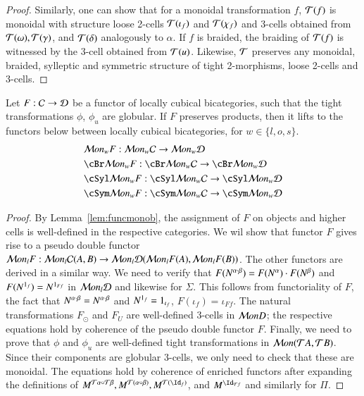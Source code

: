 \begin{proof}

Similarly, one can show that for a monoidal transformation $f$, $\mathcal{T}(f)$ is monoidal with structure loose 2-cells $\mathcal{T}(\iota_f)$ and $\mathcal{T}(\chi_f)$ and 3-cells obtained from $\mathcal{T}(\omega),  \mathcal{T}(\gamma)$, and $\mathcal{T}(\delta)$ analogously to $\alpha$. If $f$ is braided, the braiding of $\mathcal{T}(f)$ is witnessed by the 3-cell obtained from $\mathcal{T}(u)$. Likewise, $\mathcal{T}$ preserves any monoidal, braided, sylleptic and symmetric structure of tight 2-morphisms, loose 2-cells and 3-cells. 
 \end{proof}


\begin{thm}\label{thm:lcbcfunctor}
Let $F: \mathcal{C}  \rightarrow \mathcal{D}$ be a functor of locally cubical bicategories, such that the tight transformations $\phi$, $\phi_u$ are globular. If $F$ preserves products, then it lifts to the functors below between locally cubical bicategories, for $w \in \{l,o,s\}$.
\begin{align*}
&\cM on_wF: \cM on_w \cC  \rightarrow \cM on_w\cD\\ 
&\cBr \cM on_wF: \cBr \cM on_w \cC  \rightarrow \cBr \cM on_w\cD\\
& \cSyl \cM on_wF: \cSyl \cM on_w \cC  \rightarrow \cSyl \cM on_w\cD\\
&\cSym \cM on_wF: \cSym \cM on_w \cC  \rightarrow \cSym \cM on_w\cD
\end{align*}
\end{thm}

\begin{proof}
By Lemma~\ref{lem:funcmonob}, the assignment of $F$ on objects and higher cells is well-defined in the respective categories.
We wil show that functor $F$ gives rise to a pseudo double functor $\mathcal{M} on_lF: \mathcal{M} on_l \mathcal{C}(A, B)  \rightarrow \mathcal{M} on_l\mathcal{D}(\mathcal{M} on_lF(A), \mathcal{M} on_lF(B))$. The other functors are derived in a similar way. We need to verify that $F(N^{\alpha \cdot \beta}) = F(N^{\alpha}) \cdot F(N^{\beta})$ and $F(N^{1_f}) = N^{1_{Ff}}$ in $\mathcal{M} on_l\mathcal{D}$ and likewise for $\Sigma$. This follows from functoriality of $F$, the fact that $N^{\alpha \cdot \beta} = N^{\alpha \cdot \beta}$ and $N^{1_f} = 1_{\iota_f}$, $F(\iota_f) = \iota_{Ff}$.
The natural transformations $F_{\odot}$ and $F_U$ are well-defined 3-cells in $\mathcal{M} onD$; the respective equations hold by coherence of the pseudo double functor $F$.
Finally, we need to prove that $\phi$ and $\phi_u$ are well-defined tight transformations in $\mathcal{M} on(\mathcal{T} A, \mathcal{T} B)$. Since their components are globular 3-cells, we only need to check that these are monoidal. The equations hold by coherence of enriched functors after expanding the definitions of $M^{\cT\alpha \comp \cT \beta}, M^{\cT(\alpha \comp \beta)}, M^{\cT(\looseid_f)}$, and $M^{\looseid_{\cT f}}$ and similarly for $\Pi$.
\end{proof}


